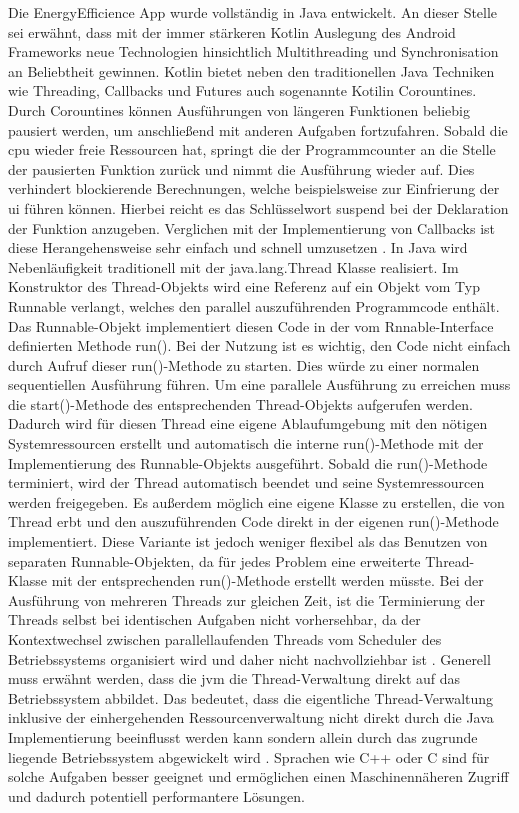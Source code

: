 Die \glqq EnergyEfficience\grqq{} App wurde vollständig in Java entwickelt. An dieser Stelle sei erwähnt, dass mit der immer stärkeren Kotlin Auslegung des Android Frameworks neue Technologien hinsichtlich Multithreading und Synchronisation an Beliebtheit gewinnen. Kotlin bietet neben den traditionellen Java Techniken wie Threading, Callbacks und Futures auch sogenannte Kotilin Corountines. Durch Corountines können Ausführungen von längeren Funktionen beliebig pausiert werden, um anschließend mit anderen Aufgaben fortzufahren. Sobald die \ac{cpu} wieder freie Ressourcen hat, springt die der Programmcounter an die Stelle der pausierten Funktion zurück und nimmt die Ausführung wieder auf. Dies verhindert blockierende Berechnungen, welche beispielsweise zur Einfrierung der \ac{ui} führen können. Hierbei reicht es das Schlüsselwort \glqq suspend\grqq{} bei der Deklaration der Funktion anzugeben. Verglichen mit der Implementierung von Callbacks ist diese Herangehensweise sehr einfach und schnell umzusetzen \cite{kotlin-corountines}. In Java wird Nebenläufigkeit traditionell mit der java.lang.Thread Klasse realisiert. Im  Konstruktor des Thread-Objekts wird eine Referenz auf ein Objekt vom Typ Runnable verlangt, welches den parallel auszuführenden Programmcode enthält. Das Runnable-Objekt implementiert diesen Code in der vom Rnnable-Interface definierten Methode run(). Bei der Nutzung ist es wichtig, den Code nicht einfach durch Aufruf dieser run()-Methode zu starten. Dies würde zu einer normalen sequentiellen Ausführung führen. Um eine parallele Ausführung zu erreichen muss die start()-Methode des entsprechenden Thread-Objekts aufgerufen werden. Dadurch wird für diesen Thread eine eigene Ablaufumgebung mit den nötigen Systemressourcen erstellt und automatisch die interne run()-Methode mit der Implementierung des Runnable-Objekts ausgeführt. Sobald die run()-Methode terminiert, wird der Thread automatisch beendet und seine Systemressourcen werden freigegeben. Es außerdem möglich eine eigene Klasse zu erstellen, die von Thread erbt und den auszuführenden Code direkt in der eigenen run()-Methode implementiert. Diese Variante ist jedoch weniger flexibel als das Benutzen von separaten Runnable-Objekten, da für jedes Problem eine erweiterte Thread-Klasse mit der entsprechenden run()-Methode erstellt werden müsste.  Bei der Ausführung von mehreren Threads zur gleichen Zeit, ist die Terminierung der Threads selbst bei identischen Aufgaben nicht vorhersehbar, da der Kontextwechsel zwischen parallellaufenden Threads vom Scheduler des Betriebssystems organisiert wird und daher nicht nachvollziehbar ist \cite{javaistauchnurInsel}. Generell muss erwähnt werden, dass die \ac{jvm} die Thread-Verwaltung direkt auf das Betriebssystem abbildet. Das bedeutet, dass die eigentliche Thread-Verwaltung inklusive der einhergehenden Ressourcenverwaltung nicht direkt durch die Java Implementierung beeinflusst werden kann sondern allein durch das zugrunde liegende Betriebssystem abgewickelt wird \cite{javaistauchnurInsel} . Sprachen wie C++ oder C sind für solche Aufgaben besser geeignet und ermöglichen einen Maschinennäheren Zugriff und dadurch potentiell performantere Lösungen.

